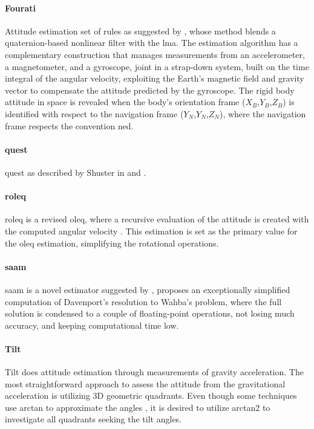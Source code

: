 \paragraph{Fourati}

Attitude estimation set of rules as suggested by \cite{fourati2010nonlinear}, whose method blends a quaternion-based nonlinear filter with the \acrfull{lma}.
The estimation algorithm has a complementary construction that manages measurements from an accelerometer, a magnetometer, and a gyroscope, joint in a strap-down system, built on the time integral of the angular velocity, exploiting the Earth's magnetic field and gravity vector to compensate the attitude predicted by the gyroscope.
The rigid body attitude in space is revealed when the body's orientation frame ($X_B$,$Y_B$,$Z_B$) is identified with respect to the navigation frame ($Y_N$,$Y_N$,$Z_N$), where the navigation frame respects the convention \acrfull{ned}.


\paragraph{\acrshort{quest}}

\acrfull{quest} as described by Shuster in \cite{shuster1981three} and \cite{shuster1978approximate}.

\paragraph{\acrshort{roleq}}

\acrfull{roleq} is a revised \acrshort{oleq}, where a recursive evaluation of the attitude is created with the computed angular velocity \cite{zhou2018optimal}. This estimation is set as the primary value for the \acrshort{oleq} estimation, simplifying the rotational operations.

\paragraph{\acrshort{saam}}

\acrfull{saam} is a novel estimator suggested by \cite{wu2018super}, proposes an exceptionally simplified computation of Davenport's resolution to Wahba's problem, where the full solution is condensed to a couple of floating-point operations, not losing much accuracy, and keeping computational time low.

\paragraph{Tilt}
Tilt does attitude estimation through measurements of gravity acceleration. The most straightforward approach to assess the attitude from the gravitational acceleration is utilizing 3D geometric quadrants.
Even though some techniques use arctan to approximate the angles \cite{fisher2010using} \cite{microelectronics2010tilt}, it is desired to utilize arctan2 to investigate all quadrants seeking the tilt angles.
